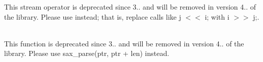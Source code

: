 \begin{DoxyRefList}
This stream operator is deprecated since 3.. and will be removed in version 4.. of the library. Please use  instead; that is, replace calls like {\ttfamily j \texorpdfstring{$<$}{<}\texorpdfstring{$<$}{<} i;} with {\ttfamily i \texorpdfstring{$>$}{>}\texorpdfstring{$>$}{>} j;}.  
\item[Member \doxylink{classbasic__json_a696ab4a7073c479bb1ef24c23c3d3d67}{basic\+\_\+json\texorpdfstring{$<$}{<} Object\+Type, Array\+Type, String\+Type, Boolean\+Type, Number\+Integer\+Type, Number\+Unsigned\+Type, Number\+Float\+Type, Allocator\+Type, JSONSerializer, Binary\+Type \texorpdfstring{$>$}{>}\+::sax\+\_\+parse} (\doxylink{classdetail_1_1span__input__adapter}{detail\+::span\+\_\+input\+\_\+adapter} \&\&i, SAX \texorpdfstring{$\ast$}{*}sax, input\+\_\+format\+\_\+t format=input\+\_\+format\+\_\+t\+::json, const bool strict=true, const bool ignore\+\_\+comments=false)]\hfill \\
\label{deprecated__deprecated000003}%
%
This function is deprecated since 3.. and will be removed in version 4.. of the library. Please use sax\+\_\+parse(ptr, ptr + len) instead. 
\end{DoxyRefList}